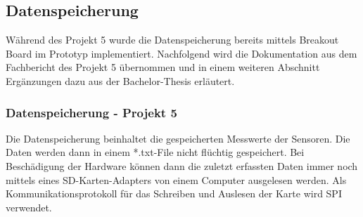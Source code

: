 \subsection{Datenspeicherung}
\label{subsec:Datenspeicherung}
Während des Projekt 5 wurde die Datenspeicherung bereits mittels Breakout Board im Prototyp implementiert. Nachfolgend wird die Dokumentation aus dem Fachbericht des Projekt 5 übernommen und in einem weiteren Abschnitt Ergänzungen dazu aus der Bachelor-Thesis erläutert.

\subsubsection{Datenspeicherung - Projekt 5}
Die Datenspeicherung beinhaltet die gespeicherten Messwerte der Sensoren. Die Daten werden dann in einem *.txt-File nicht flüchtig gespeichert. Bei Beschädigung der Hardware können dann die zuletzt erfassten Daten immer noch mittels eines SD-Karten-Adapters von einem Computer ausgelesen werden. Als Kommunikationsprotokoll für das Schreiben und Auslesen der Karte wird SPI verwendet.


